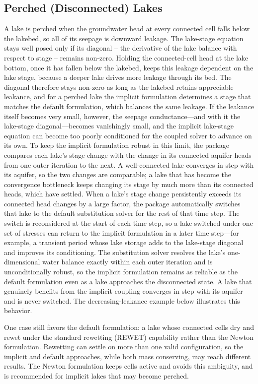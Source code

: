 \subsection{Perched (Disconnected) Lakes}

A lake is perched when the groundwater head at every connected cell falls below the lakebed, so all of its seepage is downward leakage. The lake-stage equation stays well posed only if its diagonal -- the derivative of the lake balance with respect to stage -- remains non-zero. Holding the connected-cell head at the lake bottom, once it has fallen below the lakebed, keeps this leakage dependent on the lake stage, because a deeper lake drives more leakage through its bed. The diagonal therefore stays non-zero as long as the lakebed retains appreciable leakance, and for a perched lake the implicit formulation determines a stage that matches the default formulation, which balances the same leakage. If the leakance itself becomes very small, however, the seepage conductance---and with it the lake-stage diagonal---becomes vanishingly small, and the implicit lake-stage equation can become too poorly conditioned for the coupled solver to advance on its own. To keep the implicit formulation robust in this limit, the package compares each lake's stage change with the change in its connected aquifer heads from one outer iteration to the next. A well-connected lake converges in step with its aquifer, so the two changes are comparable; a lake that has become the convergence bottleneck keeps changing its stage by much more than its connected heads, which have settled. When a lake's stage change persistently exceeds its connected head changes by a large factor, the package automatically switches that lake to the default substitution solver for the rest of that time step. The switch is reconsidered at the start of each time step, so a lake switched under one set of stresses can return to the implicit formulation in a later time step---for example, a transient period whose lake storage adds to the lake-stage diagonal and improves its conditioning. The substitution solver resolves the lake's one-dimensional water balance exactly within each outer iteration and is unconditionally robust, so the implicit formulation remains as reliable as the default formulation even as a lake approaches the disconnected state. A lake that genuinely benefits from the implicit coupling converges in step with its aquifer and is never switched. The decreasing-leakance example below illustrates this behavior.

One case still favors the default formulation: a lake whose connected cells dry and rewet under the standard rewetting (REWET) capability rather than the Newton formulation. Rewetting can settle on more than one valid configuration, so the implicit and default approaches, while both mass conserving, may reach different results. The Newton formulation keeps cells active and avoids this ambiguity, and is recommended for implicit lakes that may become perched.

